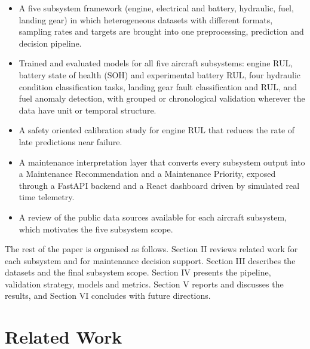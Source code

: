 \documentclass[conference]{IEEEtran}
\begin{document}
\begin{itemize}
\item A five subsystem framework (engine, electrical and battery, hydraulic, fuel, landing gear) in which heterogeneous datasets with different formats, sampling rates and targets are brought into one preprocessing, prediction and decision pipeline.
\item Trained and evaluated models for all five aircraft subsystems: engine RUL, battery state of health (SOH) and experimental battery RUL, four hydraulic condition classification tasks, landing gear fault classification and RUL, and fuel anomaly detection, with grouped or chronological validation wherever the data have unit or temporal structure.
\item A safety oriented calibration study for engine RUL that reduces the rate of late predictions near failure.
\item A maintenance interpretation layer that converts every subsystem output into a Maintenance Recommendation and a Maintenance Priority, exposed through a FastAPI backend and a React dashboard driven by simulated real time telemetry.
\item A review of the public data sources available for each aircraft subsystem, which motivates the five subsystem scope.
\end{itemize}

The rest of the paper is organised as follows. Section II reviews related work for each subsystem and for maintenance decision support. Section III describes the datasets and the final subsystem scope. Section IV presents the pipeline, validation strategy, models and metrics. Section V reports and discusses the results, and Section VI concludes with future directions.

\section{Related Work}
\end{document}
